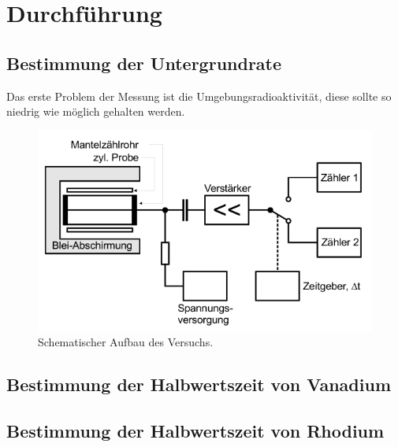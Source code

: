 \section{Durchführung}
\label{sec:Durchführung}


\subsection{Bestimmung der Untergrundrate}
\label{ssec:d1}

Das erste Problem der Messung ist die Umgebungsradioaktivität, diese sollte so niedrig wie möglich gehalten werden.


\begin{figure}
    \centering
    \includegraphics[width=\textwidth]{images/bild3.png}
    \caption{Schematischer Aufbau des Versuchs.}
    \label{fig:aufbau}
\end{figure}

\subsection{Bestimmung der Halbwertszeit von Vanadium}
\label{ssec:d2}

\subsection{Bestimmung der Halbwertszeit von Rhodium}
\label{ssec:d3}